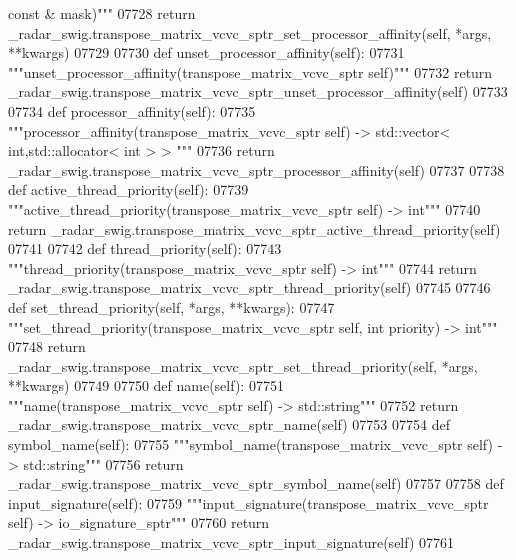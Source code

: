 \begin{DoxyCode}
{{{{{{{{{{{{{{{{{{{{{{{{{{       const & mask)"""}
07728         \textcolor{keywordflow}{return} \_radar\_swig.transpose\_matrix\_vcvc\_sptr\_set\_processor\_affinity(self, *args, **kwargs)
07729 
07730     \textcolor{keyword}{def }unset_processor_affinity(self):
07731         \textcolor{stringliteral}{"""unset\_processor\_affinity(transpose\_matrix\_vcvc\_sptr self)"""}
07732         \textcolor{keywordflow}{return} \_radar\_swig.transpose\_matrix\_vcvc\_sptr\_unset\_processor\_affinity(self)
07733 
07734     \textcolor{keyword}{def }processor_affinity(self):
07735         \textcolor{stringliteral}{"""processor\_affinity(transpose\_matrix\_vcvc\_sptr self) -> std::vector< int,std::allocator< int > >
      """}
07736         \textcolor{keywordflow}{return} \_radar\_swig.transpose\_matrix\_vcvc\_sptr\_processor\_affinity(self)
07737 
07738     \textcolor{keyword}{def }active_thread_priority(self):
07739         \textcolor{stringliteral}{"""active\_thread\_priority(transpose\_matrix\_vcvc\_sptr self) -> int"""}
07740         \textcolor{keywordflow}{return} \_radar\_swig.transpose\_matrix\_vcvc\_sptr\_active\_thread\_priority(self)
07741 
07742     \textcolor{keyword}{def }thread_priority(self):
07743         \textcolor{stringliteral}{"""thread\_priority(transpose\_matrix\_vcvc\_sptr self) -> int"""}
07744         \textcolor{keywordflow}{return} \_radar\_swig.transpose\_matrix\_vcvc\_sptr\_thread\_priority(self)
07745 
07746     \textcolor{keyword}{def }set_thread_priority(self, *args, **kwargs):
07747         \textcolor{stringliteral}{"""set\_thread\_priority(transpose\_matrix\_vcvc\_sptr self, int priority) -> int"""}
07748         \textcolor{keywordflow}{return} \_radar\_swig.transpose\_matrix\_vcvc\_sptr\_set\_thread\_priority(self, *args, **kwargs)
07749 
07750     \textcolor{keyword}{def }name(self):
07751         \textcolor{stringliteral}{"""name(transpose\_matrix\_vcvc\_sptr self) -> std::string"""}
07752         \textcolor{keywordflow}{return} \_radar\_swig.transpose\_matrix\_vcvc\_sptr\_name(self)
07753 
07754     \textcolor{keyword}{def }symbol_name(self):
07755         \textcolor{stringliteral}{"""symbol\_name(transpose\_matrix\_vcvc\_sptr self) -> std::string"""}
07756         \textcolor{keywordflow}{return} \_radar\_swig.transpose\_matrix\_vcvc\_sptr\_symbol\_name(self)
07757 
07758     \textcolor{keyword}{def }input_signature(self):
07759         \textcolor{stringliteral}{"""input\_signature(transpose\_matrix\_vcvc\_sptr self) -> io\_signature\_sptr"""}
07760         \textcolor{keywordflow}{return} \_radar\_swig.transpose\_matrix\_vcvc\_sptr\_input\_signature(self)
07761 
}}}}}}}}}}}}}}}}}}}}}}}}}
\end{DoxyCode}
